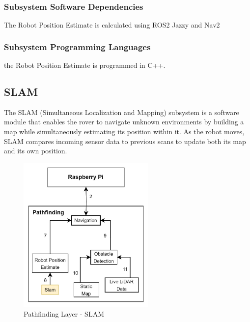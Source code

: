 \subsubsection{Subsystem Software Dependencies}
The Robot Position Estimate is calculated using ROS2 Jazzy and Nav2

\subsubsection{Subsystem Programming Languages}
the Robot Position Estimate is programmed in C++.

\newpage
\subsection{SLAM}
The SLAM (Simultaneous Localization and Mapping) subsystem is a software module that enables the rover to navigate unknown environments by building a map while simultaneously estimating its position within it. As the robot moves, SLAM compares incoming sensor data to previous scans to update both its map and its own position. 

\begin{figure}[h!]
	\centering
 	\includegraphics[width=0.60\textwidth]{images/pathfinding/slam.jpg}
 \caption{Pathfinding Layer - SLAM}
\end{figure}

